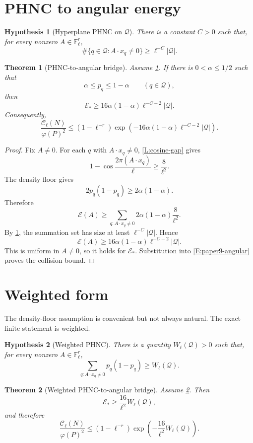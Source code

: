 \documentclass[11pt]{article}
\newtheorem{theorem}{Theorem}
\newtheorem{hypothesis}{Hypothesis}
\newcommand{\F}{\mathbb F}
\newcommand{\E}{\mathcal E}
\begin{document}
\section{PHNC to angular energy}

\begin{hypothesis}[Hyperplane PHNC on \(\mathcal Q\)]\label{H:finite-phnc}
There is a constant \(C>0\) such that, for every nonzero \(A\in\F_\ell^r\),
\[
\#\{q\in\mathcal Q:A\cdot x_q\ne0\}
\ge
\ell^{-C}|\mathcal Q|.
\]
\end{hypothesis}

\begin{theorem}[PHNC-to-angular bridge]\label{T:phnc-angular}
Assume \cref{H:finite-phnc}.  If there is \(0<\alpha\le1/2\) such that
\[
\alpha\le p_q\le1-\alpha
\qquad(q\in\mathcal Q),
\]
then
\[
\E_*
\ge
16\alpha(1-\alpha)\ell^{-C-2}|\mathcal Q|.
\]
Consequently,
\[
\frac{\mathcal C_\ell(N)}{\varphi(P)^2}
\le
(1-\ell^{-r})
\exp\left(
-16\alpha(1-\alpha)\ell^{-C-2}|\mathcal Q|
\right).
\]
\end{theorem}

\begin{proof}
Fix \(A\ne0\).  For each \(q\) with \(A\cdot x_q\ne0\), \cref{L:cosine-gap} gives
\[
1-\cos\frac{2\pi(A\cdot x_q)}{\ell}
\ge
\frac8{\ell^2}.
\]
The density floor gives
\[
2p_q(1-p_q)\ge2\alpha(1-\alpha).
\]
Therefore
\[
\E(A)
\ge
\sum_{q:A\cdot x_q\ne0}
2\alpha(1-\alpha)\frac8{\ell^2}.
\]
By \cref{H:finite-phnc}, the summation set has size at least \(\ell^{-C}|\mathcal Q|\).  Hence
\[
\E(A)\ge16\alpha(1-\alpha)\ell^{-C-2}|\mathcal Q|.
\]
This is uniform in \(A\ne0\), so it holds for \(\E_*\).  Substitution into \eqref{E:paper9-angular} proves the collision bound.
\end{proof}

\section{Weighted form}

The density-floor assumption is convenient but not always natural.  The exact finite statement is weighted.

\begin{hypothesis}[Weighted PHNC]\label{H:weighted-phnc}
There is a quantity \(W_\ell(\mathcal Q)>0\) such that, for every nonzero \(A\in\F_\ell^r\),
\[
\sum_{q:A\cdot x_q\ne0}p_q(1-p_q)\ge W_\ell(\mathcal Q).
\]
\end{hypothesis}

\begin{theorem}[Weighted PHNC-to-angular bridge]\label{T:weighted}
Assume \cref{H:weighted-phnc}.  Then
\[
\E_*\ge \frac{16}{\ell^2}W_\ell(\mathcal Q),
\]
and therefore
\[
\frac{\mathcal C_\ell(N)}{\varphi(P)^2}
\le
(1-\ell^{-r})\exp\left(-\frac{16}{\ell^2}W_\ell(\mathcal Q)\right).
\]
\end{theorem}
\end{document}
